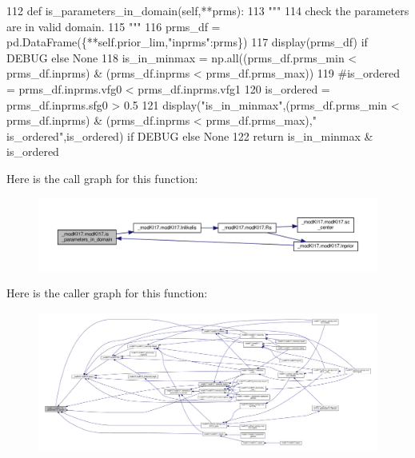\begin{DoxyCode}
112     \textcolor{keyword}{def }is\_parameters\_in\_domain(self,**prms):
113         \textcolor{stringliteral}{"""}
114 \textcolor{stringliteral}{        check the parameters are in valid domain.}
115 \textcolor{stringliteral}{        """}
116         prms\_df = pd.DataFrame(\{**self.prior\_lim,\textcolor{stringliteral}{"inprms"}:prms\})
117         display(prms\_df) \textcolor{keywordflow}{if} DEBUG \textcolor{keywordflow}{else} \textcolor{keywordtype}{None}
118         is\_in\_minmax = np.all((prms\_df.prms\_min < prms\_df.inprms) & (prms\_df.inprms < prms\_df.prms\_max))
119         \textcolor{comment}{#is\_ordered = prms\_df.inprms.vfg0 < prms\_df.inprms.vfg1}
120         is\_ordered = prms\_df.inprms.sfg0 > 0.5
121         display(\textcolor{stringliteral}{"is\_in\_minmax"},(prms\_df.prms\_min < prms\_df.inprms) & (prms\_df.inprms < prms\_df.prms\_max),\textcolor{stringliteral}{"
      is\_ordered"},is\_ordered) \textcolor{keywordflow}{if} DEBUG \textcolor{keywordflow}{else} \textcolor{keywordtype}{None}
122         \textcolor{keywordflow}{return} is\_in\_minmax & is\_ordered
\end{DoxyCode}
Here is the call graph for this function\+:\nopagebreak
\begin{figure}[H]
\begin{center}
\leavevmode
\includegraphics[width=350pt]{d8/d2c/class__modKI17_1_1modKI17_a9df500ff2a922b4ec30f3cfc27b07b6a_cgraph}
\end{center}
\end{figure}
Here is the caller graph for this function\+:\nopagebreak
\begin{figure}[H]
\begin{center}
\leavevmode
\includegraphics[width=350pt]{d8/d2c/class__modKI17_1_1modKI17_a9df500ff2a922b4ec30f3cfc27b07b6a_icgraph}
\end{center}
\end{figure}
\mbox{\label{class__modKI17_1_1modKI17_a26cef1b72664426d0186a60a27762932}} 
